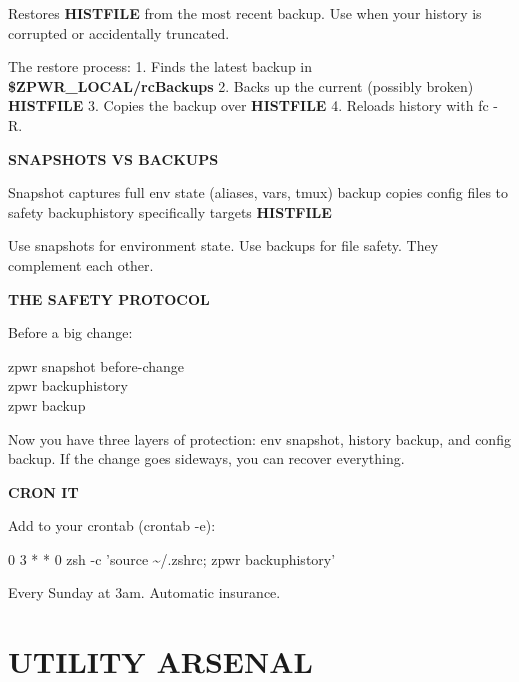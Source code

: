 \documentclass[11pt,a4paper,twoside]{book}
\begin{document}
Restores \textbf{HISTFILE} from the most recent backup. Use when your history is corrupted or accidentally truncated.

The restore process: 1. Finds the latest backup in \textbf{\$ZPWR\_LOCAL/rcBackups} 2. Backs up the current (possibly broken) \textbf{HISTFILE} 3. Copies the backup over \textbf{HISTFILE} 4. Reloads history with fc -R.


\vspace{12pt}
{\bfseries\color{neonyellow} SNAPSHOTS VS BACKUPS}\vspace{4pt}

Snapshot          captures full env state (aliases, vars, tmux) backup            copies config files to safety backuphistory     specifically targets \textbf{HISTFILE}

Use snapshots for environment state. Use backups for file safety. They complement each other.


\vspace{12pt}
{\bfseries\color{neonyellow} THE SAFETY PROTOCOL}\vspace{4pt}

Before a big change:

\begin{codebox}
\color{neongreen}zpwr snapshot before-change\\
\color{neongreen}zpwr backuphistory\\
\color{neongreen}zpwr backup\\
\end{codebox}

Now you have three layers of protection: env snapshot, history backup, and config backup. If the change goes sideways, you can recover everything.


\vspace{12pt}
{\bfseries\color{neonyellow} CRON IT}\vspace{4pt}

Add to your crontab (crontab -e):

\begin{codebox}
\color{neongreen}0 3 * * 0 zsh -c 'source \textasciitilde{}/.zshrc; zpwr backuphistory'\\
\end{codebox}

Every Sunday at 3am. Automatic insurance.


\vspace{16pt}


\chapter{UTILITY ARSENAL}
\end{document}
